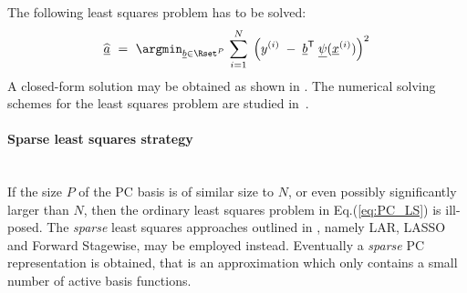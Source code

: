 {  The following least squares problem has to be solved:
  \begin{equation} \label{eq:PC_LS}
    \widehat{\underline{a}} \, \, = \, \,  \argmin_{\underline{b} \in \Rset^{P}} \,  \sum_{i=1}^N \; \left( y^{(i)} \; - \; \underline{b}^{\textsf{T}} \; \underline{\psi}(\underline{x}^{(i)}) \right)^2
  \end{equation}
  A closed-form solution may be obtained as shown in . The numerical solving schemes for the least squares problem are studied in~.

  \paragraph*{Sparse least squares strategy \\ \\}

  If the size $P$ of the PC basis is of similar size to $N$, or even possibly significantly larger than $N$, then the ordinary least squares problem in Eq.(\ref{eq:PC_LS}) is ill-posed. The \emph{sparse} least squares approaches outlined in , namely LAR, LASSO and Forward Stagewise, may be employed instead. Eventually a \emph{sparse} PC representation is obtained, that is an approximation which only contains a small number of active basis functions.

}
